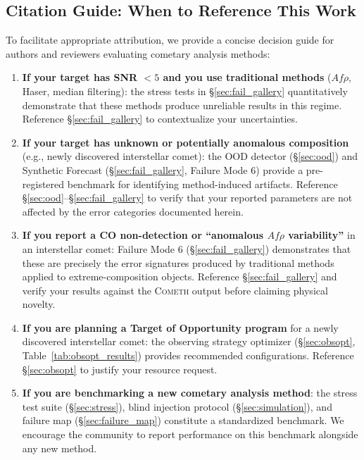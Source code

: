 \documentclass[usenatbib]{mnras}
\begin{document}
\subsection{Citation Guide: When to Reference This Work}

To facilitate appropriate attribution, we provide a concise decision guide for authors and reviewers evaluating cometary analysis methods:

\begin{enumerate}
    \item \textbf{If your target has SNR $<5$ and you use traditional methods} ($Af\rho$, Haser, median filtering): the stress tests in \S\ref{sec:fail_gallery} quantitatively demonstrate that these methods produce unreliable results in this regime. Reference \S\ref{sec:fail_gallery} to contextualize your uncertainties.
    \item \textbf{If your target has unknown or potentially anomalous composition} (e.g., newly discovered interstellar comet): the OOD detector (\S\ref{sec:ood}) and Synthetic Forecast (\S\ref{sec:fail_gallery}, Failure Mode 6) provide a pre-registered benchmark for identifying method-induced artifacts. Reference \S\ref{sec:ood}--\S\ref{sec:fail_gallery} to verify that your reported parameters are not affected by the error categories documented herein.
    \item \textbf{If you report a CO non-detection or ``anomalous $Af\rho$ variability''} in an interstellar comet: Failure Mode 6 (\S\ref{sec:fail_gallery}) demonstrates that these are precisely the error signatures produced by traditional methods applied to extreme-composition objects. Reference \S\ref{sec:fail_gallery} and verify your results against the \textsc{Cometh} output before claiming physical novelty.
    \item \textbf{If you are planning a Target of Opportunity program} for a newly discovered interstellar comet: the observing strategy optimizer (\S\ref{sec:obsopt}, Table~\ref{tab:obsopt_results}) provides recommended configurations. Reference \S\ref{sec:obsopt} to justify your resource request.
    \item \textbf{If you are benchmarking a new cometary analysis method}: the stress test suite (\S\ref{sec:stress}), blind injection protocol (\S\ref{sec:simulation}), and failure map (\S\ref{sec:failure_map}) constitute a standardized benchmark. We encourage the community to report performance on this benchmark alongside any new method.
\end{enumerate}
\end{document}
